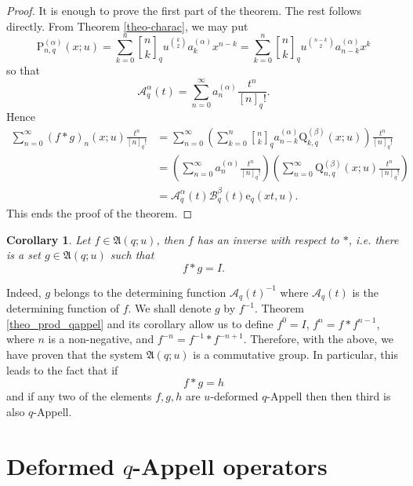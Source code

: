 \documentclass[12pt]{article}
\newcommand{\qbinom}{\genfrac{[}{]}{0pt}{}}
\newcommand{\e}{\mathrm{e}}
\newcommand{\A}{\mathcal{A}}
\newcommand{\p}{\mathrm{P}}
\newtheorem{corollary}{Corollary}
\begin{document}
\begin{proof}
It is enough to prove the first part of the theorem. The rest follows directly. From Theorem \ref{theo-charac}, we may put
\begin{equation*}
    \p_{n,q}^{(\alpha)}(x;u)=\sum_{k=0}^{n}\qbinom{n}{k}_{q}u^{\binom{k}{2}}a_{k}^{(\alpha)}x^{n-k}=\sum_{k=0}^{n}\qbinom{n}{k}_{q}u^{\binom{n-k}{2}}a_{n-k}^{(\alpha)}x^k
\end{equation*}
so that 
\begin{equation*}
    \A_{q}^{\alpha}(t)=\sum_{n=0}^{\infty}a_{n}^{(\alpha)}\frac{t^n}{[n]_{q}!}.
\end{equation*}
Hence
\begin{align*}
    \sum_{n=0}^{\infty}(f*g)_{n}(x;u)\frac{t^n}{[n]_{q}!}&=\sum_{n=0}^{\infty}\left(\sum_{k=0}^{n}\qbinom{n}{k}_{q}a_{n-k}^{(\alpha)}\mathrm{Q}_{k,q}^{(\beta)}(x;u)\right)\frac{t^n}{[n]_{q}!}\\
    &=\left(\sum_{n=0}^{\infty}a^{(\alpha)}_{n}\frac{t^n}{[n]_{q}!}\right)\left(\sum_{n=0}^{\infty}\mathrm{Q}^{(\beta)}_{n,q}(x;u)\frac{t^n}{[n]_{q}!}\right)\\
    &=\A_{q}^{\alpha}(t)\mathcal{B}^{\beta}_{q}(t)\e_{q}(xt,u).
\end{align*}
This ends the proof of the theorem.
\end{proof}
\begin{corollary}
Let $f\in\mathfrak{A}(q;u)$, then $f$ has an inverse with respect to $*$, i.e. there is a set $g\in\mathfrak{A}(q;u)$ such that
\begin{equation*}
    f*g=I.
\end{equation*}
\end{corollary}
Indeed, $g$ belongs to the determining function $\A_{q}(t)^{-1}$ where $\A_{q}(t)$ is the determining function of $f$. We shall denote $g$ by $f^{-1}$. Theorem \ref{theo_prod_qappel} and its corollary allow us to define $f^0=I$, $f^n=f*f^{n-1}$, where $n$ is a non-negative, and $f^{-n}=f^{-1}*f^{-n+1}$. Therefore, with the above, we have proven that the system $\mathfrak{A}(q;u)$ is a commutative group. In particular, this leads to the fact that if 
\begin{equation*}
    f*g=h
\end{equation*}
and if any two of the elements $f,g,h$ are $u$-deformed $q$-Appell then then third is also $q$-Appell. 

\section{Deformed $q$-Appell operators}
\end{document}
